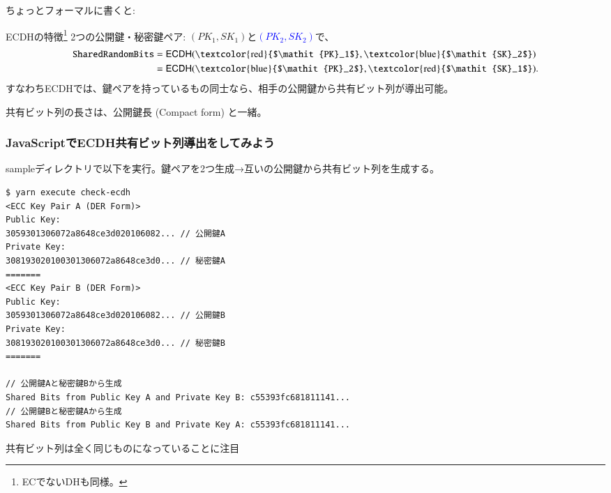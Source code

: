 \documentclass[12pt,dvipdfmx]{beamer}
\begin{document}
\begin{frame}
ちょっとフォーマルに書くと:
\begin{block}{\small ECDHの特徴\footnote[frame]{\scriptsize ECでないDHも同様。}}
2つの公開鍵・秘密鍵ペア: \alert{$(\mathit{PK_1}, \mathit{SK}_1)$}と\textcolor{blue}{$(\mathit{PK_2}, \mathit{SK}_2)$}で、
\begin{align*}
\mathtt{SharedRandomBits} &= \mathsf{ECDH}(
\text{\textcolor{red}{$\mathit{PK}_1$}},
\text{\textcolor{blue}{$\mathit{SK}_2$}}
)\\
& = \mathsf{ECDH}(
\text{\textcolor{blue}{$\mathit{PK}_2$}},
\text{\textcolor{red}{$\mathit{SK}_1$}}
).
\end{align*}
すなわちECDHでは、\alert{鍵ペアを持っているもの同士なら、相手の公開鍵から共有ビット列が導出可能}。
\end{block}

共有ビット列の長さは、公開鍵長 (Compact form) と一緒。
\end{frame}

\begin{frame}[fragile]
\frametitle{JavaScriptでECDH共有ビット列導出をしてみよう}
sampleディレクトリで以下を実行。鍵ペアを2つ生成→互いの公開鍵から共有ビット列を生成する。

\begin{exampleblock}{}
\scriptsize
\begin{verbatim}
$ yarn execute check-ecdh
<ECC Key Pair A (DER Form)>
Public Key:
3059301306072a8648ce3d020106082... // 公開鍵A
Private Key:
308193020100301306072a8648ce3d0... // 秘密鍵A
=======
<ECC Key Pair B (DER Form)>
Public Key:
3059301306072a8648ce3d020106082... // 公開鍵B
Private Key:
308193020100301306072a8648ce3d0... // 秘密鍵B
=======

// 公開鍵Aと秘密鍵Bから生成
Shared Bits from Public Key A and Private Key B: c55393fc681811141...
// 公開鍵Bと秘密鍵Aから生成
Shared Bits from Public Key B and Private Key A: c55393fc681811141...
\end{verbatim}
\end{exampleblock}
共有ビット列は全く同じものになっていることに注目
\end{frame}
\end{document}
